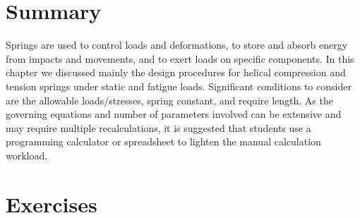 \documentclass[
10pt,
a4paper,
openany,
svgnames,
]{book}
\begin{document}
\section*{Summary}

Springs are used to control loads and deformations, to store and absorb energy from impacts and movements, and to exert loads on specific components. In this chapter we discussed mainly the design procedures for helical compression and tension springs under static and fatigue loads. Significant conditions to consider are the allowable loads/stresses, spring constant, and require length. As the governing equations and number of parameters involved can be extensive and may require multiple recalculations, it is suggested that students use a programming calculator or spreadsheet to lighten the manual calculation workload.

\section*{Exercises}
\end{document}
